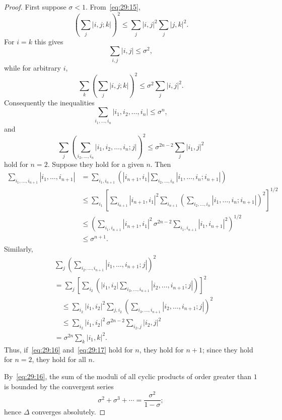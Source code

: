 \documentclass[
  paper=b5,
  fontsize=13pt,
  twoside=true,
  open=any,
  bookmarkpackage=false,
  chapterprefix=true,
  headings=normal
]{scrbook}
\theoremstyle{definition}
\begin{document}
\begin{proof}
First suppose $\sigma<1$. From~\eqref{eq:29:15},
\[
 \left(\sum_j|i,j;k|\right)^2
 \leq\sum_j|i,j|^2\sum_j|j,k|^2.
\]
For $i=k$ this gives
\[
 \sum_{i,j}|i,j|\leq\sigma^2,
\]
while for arbitrary $i$,
\[
 \sum_k\left(\sum_j|i,j;k|\right)^2
 \leq\sigma^2\sum_j|i,j|^2.
\]
Consequently the inequalities
\begin{equation}
 \sum_{i_1,\ldots,i_n}|i_1,i_2,\ldots,i_n|\leq\sigma^n,
 \tag{16}\label{eq:29:16}
\end{equation}
and
\begin{equation}
 \sum_j\left(\sum_{i_2,\ldots,i_n}
 |i_1,i_2,\ldots,i_n;j|\right)^2
 \leq\sigma^{2n-2}\sum_j|i_1,j|^2
 \tag{17}\label{eq:29:17}
\end{equation}
hold for $n=2$. Suppose they hold for a given $n$. Then
\begin{align*}
 \sum_{i_1,\ldots,i_{n+1}}|i_1,\ldots,i_{n+1}|
 &=\sum_{i_1,i_{n+1}}
 \left(
   |i_{n+1},i_1|
   \sum_{i_2,\ldots,i_n}|i_1,\ldots,i_n;i_{n+1}|
 \right)\\
 &\leq
 \sum_{i_1}
 \left[
   \sum_{i_{n+1}}|i_{n+1},i_1|^2
   \sum_{i_{n+1}}
   \left(\sum_{i_2,\ldots,i_n}|i_1,\ldots,i_n;i_{n+1}|\right)^2
 \right]^{1/2}\\
 &\leq
 \left(
   \sum_{i_1,i_{n+1}}|i_{n+1},i_1|^2\,
   \sigma^{2n-2}
   \sum_{i_1,i_{n+1}}|i_1,i_{n+1}|^2
 \right)^{1/2}\\
 &\leq\sigma^{n+1}.
\end{align*}
Similarly,
\begin{align*}
 &\sum_j\left(\sum_{i_2,\ldots,i_{n+1}}
 |i_1,\ldots,i_{n+1};j|\right)^2\\
 &=\sum_j\left[
   \sum_{i_2}\left(
     |i_1,i_2|
     \sum_{i_3,\ldots,i_{n+1}}|i_2,\ldots,i_{n+1};j|
   \right)
 \right]^2\\
 &\quad\leq
 \sum_{i_2}|i_1,i_2|^2
 \sum_{j,i_2}\left(\sum_{i_3,\ldots,i_{n+1}}
 |i_2,\ldots,i_{n+1};j|\right)^2\\
 &\quad\leq
 \sum_{i_2}|i_1,i_2|^2\,
 \sigma^{2n-2}\sum_{i_2,j}|i_2,j|^2\\
 &=\sigma^{2n}\sum_k|i_1,k|^2.
\end{align*}
Thus, if~\eqref{eq:29:16} and~\eqref{eq:29:17} hold for $n$, they hold for $n+1$; since they hold for $n=2$, they hold for all $n$.

By~\eqref{eq:29:16}, the sum of the moduli of all cyclic products of order greater than $1$ is bounded by the convergent series
\[
 \sigma^2+\sigma^3+\cdots=\frac{\sigma^2}{1-\sigma};
\]
hence $\Delta$ converges absolutely.


\end{proof}
\end{document}
